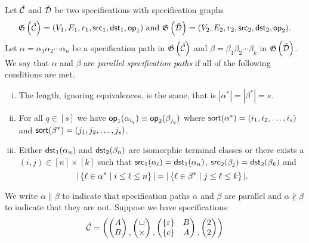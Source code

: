 \begin{definition}
Let $\check{\mathcal{C}}$ and $\check{\mathcal{D}}$ be two specifications with specification graphs 
\[
\mathfrak{G}\left(\check{\mathcal{C}}\right)=(V_1,E_1,r_1,\textsf{src}_1,\textsf{dst}_1,\textsf{op}_1) \text{ and } \mathfrak{G}\left(\check{\mathcal{D}}\right) = (V_2,E_2,r_2,\textsf{src}_2,\textsf{dst}_2,\textsf{op}_2).
\]
Let $\alpha=\alpha_1\alpha_2 \dotsm \alpha_n$ be a specification path in $\mathfrak{G}\left(\check{\mathcal{C}}\right)$ and $\beta=\beta_1\beta_2 \dotsm \beta_k$ in $\mathfrak{G}\left(\check{\mathcal{D}}\right)$. We say that $\alpha$ and $\beta$ are \emph{parallel specification paths} if all of the following conditions are met.
\begin{enumerate}[i.]
    \item The length, ignoring equivalences, is the same, that is $|\alpha^\ast| = |\beta^\ast| = s$.
    \item For all $q\in[s]$ we have $\textsf{op}_1(\alpha_{i_q}) \equiv \textsf{op}_2(\beta_{j_q})$ where $\textsf{sort}(\alpha^\ast) = (i_1,i_2,\dotsc,i_s)$ and $\textsf{sort}(\beta^\ast) = (j_1,j_2,\dotsc,j_s)$.
    \item Either $\textsf{dst}_1(\alpha_n)$ and $\textsf{dst}_2(\beta_n)$ are isomorphic terminal classes or there exists a $(i,j) \in [n] \times [k]$ such that $\textsf{src}_1(\alpha_i) = \textsf{dst}_1(\alpha_n)$, $\textsf{src}_2(\beta_j) = \textsf{dst}_2(\beta_k)$ and
    \[
        |\left\{\ell \in \alpha^\ast \mid i \leq \ell \leq n\right\}| = |\left\{\ell \in \beta^\ast \mid j \leq \ell \leq k\right\}|.
    \]
\end{enumerate}
\end{definition}
We write $\alpha \parallel \beta$ to indicate that specification paths $\alpha$ and $\beta$ are parallel and $\alpha \nparallel \beta$ to indicate that they are not. Suppose we have specifications
\[
    \check{\mathcal{C}} = \left(
        \begin{pmatrix}
            A\\
            B
        \end{pmatrix}
        \begin{matrix}\\,\end{matrix}
        \begin{pmatrix}
            \sqcup\\
            \times
        \end{pmatrix}
        \begin{matrix}\\,\end{matrix}
        \begin{pmatrix}
            \left\{\varepsilon\right\} & B\\
            \left\{c\right\} & A
        \end{pmatrix}
        \begin{matrix}\\,\end{matrix}
        \begin{pmatrix}
            2\\
            2
        \end{pmatrix}
    \right)
\]
